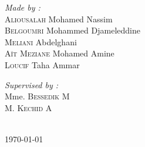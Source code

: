 {\begin{titlepage}
  \noindent
  \begin{minipage}{0.6\textwidth}
      \vspace{-7mm}
    \begin{flushleft} \large
      \emph{Made by :}\\
      \textsc{Aliousalah} Mohamed Nassim\\
      \textsc{Belgoumri} Mohammed Djameleddine\\
      \textsc{Meliani} Abdelghani\\
      \textsc{Aït Meziane} Mohamed Amine\\
      \textsc{Loucif} Taha Ammar\\
    \end{flushleft}
  \end{minipage}
  \begin{minipage}{0.3\textwidth}
    \begin{flushright} \large
      \begin{flushleft} \large
      \emph{Supervised by :} \\
      {
        Mme. \textsc{Bessedik} M\\[0.1cm]
        M. \textsc{Kechid} A\\[0.1cm]
      }
      \end{flushleft}

    \end{flushright}
  \end{minipage}\\[1cm]

  
  \vspace{20mm}
  {\large \today}        
  \end{titlepage}
  \restoregeometry
}